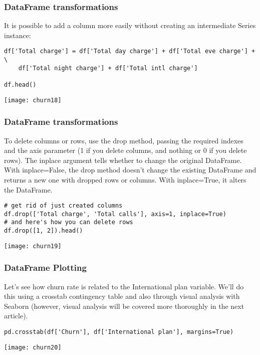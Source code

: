 \begin{frame}[fragile]\frametitle{DataFrame transformations}	
It is possible to add a column more easily without creating an intermediate Series instance:
\begin{lstlisting}
df['Total charge'] = df['Total day charge'] + df['Total eve charge'] + \
    df['Total night charge'] + df['Total intl charge']

df.head()
\end{lstlisting}
\begin{center}
\texttt{[image: churn18]}
\end{center}
\end{frame}

\begin{frame}[fragile]\frametitle{DataFrame transformations}	
To delete columns or rows, use the drop method, passing the required indexes and the axis parameter (1 if you delete columns, and nothing or 0 if you delete rows). The inplace argument tells whether to change the original DataFrame. With inplace=False, the drop method doesn't change the existing DataFrame and returns a new one with dropped rows or columns. With inplace=True, it alters the DataFrame.
\begin{lstlisting}
# get rid of just created columns
df.drop(['Total charge', 'Total calls'], axis=1, inplace=True) 
# and here's how you can delete rows
df.drop([1, 2]).head() 
\end{lstlisting}
\begin{center}
\texttt{[image: churn19]}
\end{center}
\end{frame}

\begin{frame}[fragile]\frametitle{DataFrame Plotting}	
Let's see how churn rate is related to the International plan variable. We’ll do this using a crosstab contingency table and also through visual analysis with Seaborn (however, visual analysis will be covered more thoroughly in the next article).
\begin{lstlisting}
pd.crosstab(df['Churn'], df['International plan'], margins=True)
\end{lstlisting}
\begin{center}
\texttt{[image: churn20]}
\end{center}
\end{frame}


